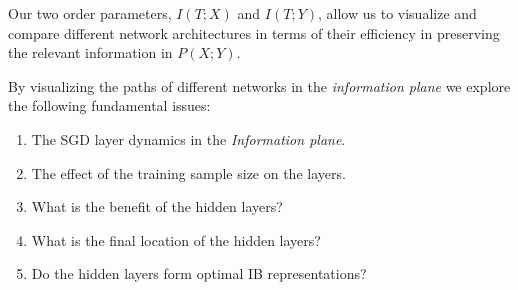 \documentclass[11pt]{article}
\newcommand{\ignore}[1]{}
\begin{document}
\ignore{Due to the invariance property of the mutual information, Eq. (\ref{eqn:invariance}), each point in the \textit{information plane} represents an ensemble of possible networks/layers with the same information efficiency but possibly very different connections.}
Our two order parameters, $I(T;X)$ and $I(T;Y)$, allow us to visualize and compare different network architectures in terms of their efficiency in preserving the relevant information in $P(X;Y)$.

By visualizing the paths of different networks in the \textit{information plane} we explore the following fundamental issues: 
\begin{enumerate}
\item The SGD layer dynamics in the \textit{Information plane}.
\item The effect of the training sample size on the layers.
\item What is the benefit of the hidden layers?
\item What is the final location of the hidden layers?
\item Do the hidden layers form optimal IB representations? 
\end{enumerate}
\end{document}
